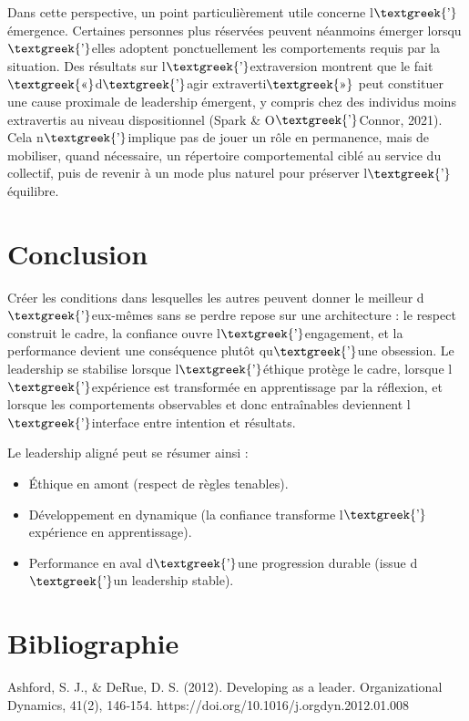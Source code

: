 \documentclass{article}
\begin{document}
Dans cette perspective, un point particulièrement utile concerne l$\text{\textgreek{’}}$émergence. Certaines personnes
plus réservées peuvent néanmoins émerger lorsqu$\text{\textgreek{’}}$elles adoptent ponctuellement les comportements
requis par la situation. Des résultats sur l$\text{\textgreek{’}}$extraversion montrent que le fait
$\text{\textgreek{«}}$d$\text{\textgreek{’}}$agir extraverti$\text{\textgreek{»}}$ peut constituer une cause proximale
de leadership émergent, y compris chez des individus moins extravertis au niveau dispositionnel
\label{ref:RNDMqlxd5aVFJ}(Spark \& O$\text{\textgreek{’}}$Connor, 2021). Cela n$\text{\textgreek{’}}$implique pas de
jouer un rôle en permanence, mais de mobiliser, quand nécessaire, un répertoire comportemental ciblé au service du
collectif, puis de revenir à un mode plus naturel pour préserver l$\text{\textgreek{’}}$équilibre.

\section{Conclusion}
Créer les conditions dans lesquelles les autres peuvent donner le meilleur d$\text{\textgreek{’}}$eux-mêmes sans se
perdre repose sur une architecture : le respect construit le cadre, la confiance ouvre
l$\text{\textgreek{’}}$engagement, et la performance devient une conséquence plutôt qu$\text{\textgreek{’}}$une
obsession. Le leadership se stabilise lorsque l$\text{\textgreek{’}}$éthique protège le cadre, lorsque
l$\text{\textgreek{’}}$expérience est transformée en apprentissage par la réflexion, et lorsque les comportements
observables et donc entraînables deviennent l$\text{\textgreek{’}}$interface entre intention et résultats.

Le leadership aligné peut se résumer ainsi :

\begin{itemize}
\item Éthique en amont (respect de règles tenables).
\end{itemize}
\begin{itemize}
\item Développement en dynamique (la confiance transforme l$\text{\textgreek{’}}$expérience en apprentissage).
\item Performance en aval d$\text{\textgreek{’}}$une progression durable (issue d$\text{\textgreek{’}}$un leadership
stable).
\end{itemize}
\section{Bibliographie}
Ashford, S. J., \& DeRue, D. S. (2012). Developing as a leader. Organizational Dynamics, 41(2), 146‑154.
https://doi.org/10.1016/j.orgdyn.2012.01.008
\end{document}
